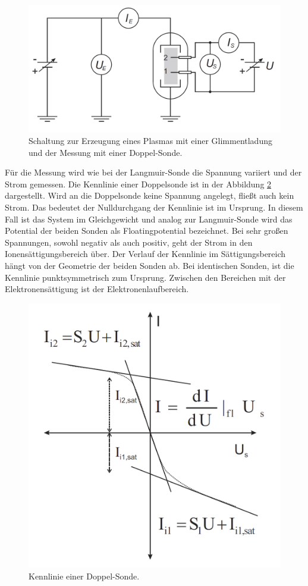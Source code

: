 \begin{figure}[H]
\centering
\includegraphics[scale=0.4]{Schaltung_Doppel_Sonde.PNG}
\caption{Schaltung zur Erzeugung eines Plasmas mit einer Glimmentladung und der Messung mit einer Doppel-Sonde. \cite{anleitung}}
\label{fig:Schaltung_Doppel_Sonde}
\end{figure}
Für die Messung wird wie bei der Langmuir-Sonde die Spannung variiert und der Strom gemessen.  Die Kennlinie einer Doppelsonde ist in der Abbildung \ref{fig:Kennlinie_Doppel_Sonde} dargestellt. Wird an die Doppelsonde keine Spannung angelegt, fließt auch kein Strom. Das bedeutet der Nulldurchgang der Kennlinie ist im Ursprung.  In diesem Fall ist das System im Gleichgewicht und analog zur Langmuir-Sonde wird das Potential der beiden Sonden als Floatingpotential bezeichnet. Bei sehr großen Spannungen, sowohl negativ als auch positiv, geht der Strom in den Ionensättigungsbereich über. Der Verlauf der Kennlinie im Sättigungsbereich hängt von der Geometrie der beiden Sonden ab. Bei identischen Sonden, ist die Kennlinie punktsymmetrisch zum Ursprung. Zwischen den Bereichen mit der Elektronensättigung ist der Elektronenlaufbereich. 
\begin{figure}[H]
\centering
\includegraphics[scale=0.4]{Kennlinie_Doppel_Sonde.PNG}
\caption{Kennlinie einer Doppel-Sonde. \cite{anleitung}}
\label{fig:Kennlinie_Doppel_Sonde}
\end{figure}
